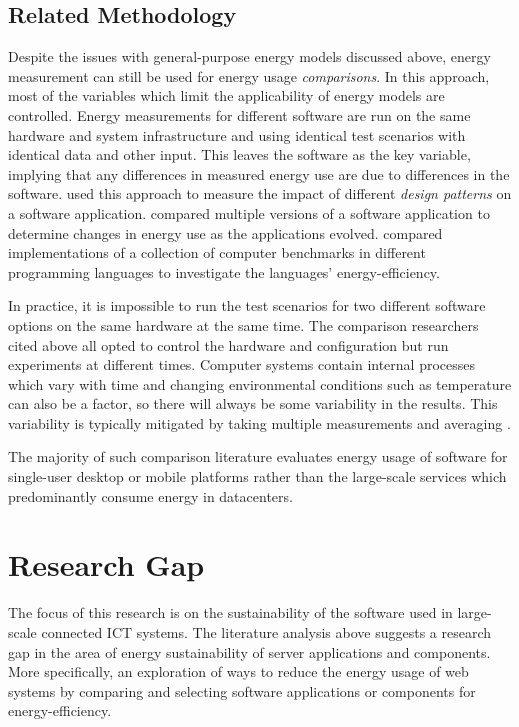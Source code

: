 \subsection{Related Methodology}
\label{literature:related methods}

Despite the issues with general-purpose energy models discussed above, energy measurement can still be used for energy usage \emph{comparisons}. In this approach, most of the variables which limit the applicability of energy models are controlled. Energy measurements for different software are run on the same hardware and system infrastructure and using identical test scenarios with identical data and other input. This leaves the software as the key variable, implying that any differences in measured energy use are due to differences in the software. \citet{Bunse2013} used this approach to measure the impact of different \emph{design patterns} \citep{Fowler1999} on a software application. \citet{Zhang2014a} compared multiple versions of a software application to determine changes in energy use as the applications evolved. \citet{Pereira2021} compared implementations of a collection of computer benchmarks in different programming languages to investigate the languages' energy-efficiency. 

In practice, it is impossible to run the test scenarios for two different software options on the same hardware at the same time. The comparison researchers cited above all opted to control the hardware and configuration but run experiments at different times. Computer systems contain internal processes which vary with time and changing environmental conditions such as temperature can also be a factor, so there will always be some variability in the results. This variability is typically mitigated by taking multiple measurements and averaging \citep{Zhang2014a} \citep{Pereira2021}.

The majority of such comparison literature evaluates energy usage of software for single-user desktop or mobile platforms rather than the large-scale services which predominantly consume energy in datacenters.

\section{Research Gap}
\label{literature:gap}

The focus of this research is on the sustainability of the software used in large-scale connected ICT systems. The literature analysis above suggests a research gap in the area of energy sustainability of server applications and components. More specifically, an exploration of ways to reduce the energy usage of web systems by comparing and selecting software applications or components for energy-efficiency.

